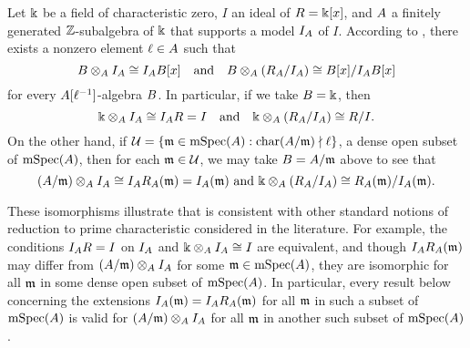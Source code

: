 \documentclass{article}
\begin{document}
\begin{remark}
   Let $\Bbbk$ be a field of characteristic zero, $I$ an ideal of $R=\Bbbk[x]$, and $A$ a finitely generated $\mathbb{Z}$-subalgebra of $\Bbbk$ that supports a model $I_A$ of $I$.  
According to , there exists a nonzero element $\ell \in A$ such that 
\[ B \otimes_A I_A  \cong I_A B[x] \quad \text{and} \quad B \otimes_A (R_A / I_A)  \cong B[x]/I_A B[x] \] 
for every $A[\ell^{-1}]$-algebra $B$.  In particular, if we take $B=\Bbbk$, then
\[ \Bbbk \otimes_A I_A  \cong I_A R = I  \quad \text{and} \quad \Bbbk \otimes_A (R_A / I_A)  \cong R/I. \] 
On the other hand, if $\mathcal{U} = \{ \mathfrak{m} \in \operatorname{mSpec}(A) : \operatorname{char}(A/\mathfrak{m}) \nmid \ell \}$,  a dense open subset of $\operatorname{mSpec}(A)$, 
 then for each $\mathfrak{m} \in \mathcal{U}$, we may take $B=A/\mathfrak{m}$ above to see that 
\[ (A/\mathfrak{m}) \otimes_A I_A  \cong I_A R_A(\mathfrak{m}) = I_A(\mathfrak{m})  \text{ and } \Bbbk \otimes_A (R_A / I_A)  \cong R_A(\mathfrak{m}) /I_A(\mathfrak{m}). \] 

These isomorphisms illustrate that   is consistent with other standard notions of reduction to prime characteristic considered in the literature.
For example, the conditions $I_A R = I$ on $I_A$ and $\Bbbk \otimes_A I_A \cong I$ are equivalent, and though $I_A R_A(\mathfrak{m})$  may differ from $(A/\mathfrak{m}) \otimes_A I_A$ for some $\mathfrak{m} \in \operatorname{mSpec}(A)$, they are isomorphic for all $\mathfrak{m}$ in some dense open subset of $\operatorname{mSpec}(A)$.
In particular, every result below concerning the extensions $I_A(\mathfrak{m}) =I_A R_A(\mathfrak{m})$ for all $\mathfrak{m}$ in such a subset of $\operatorname{mSpec}(A)$ is valid for $(A/\mathfrak{m}) \otimes_A I_A$ for all $\mathfrak{m}$ in another such subset of $\operatorname{mSpec}(A)$.
\end{remark}
\end{document}
